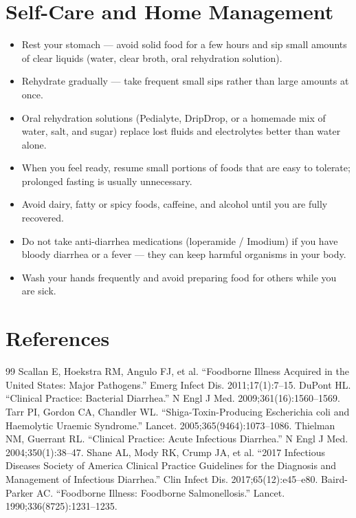 \section*{Self-Care and Home Management}
\begin{itemize}
  \item Rest your stomach — avoid solid food for a few hours and sip small amounts of clear liquids (water, clear broth, oral rehydration solution).
  \item Rehydrate gradually — take frequent small sips rather than large amounts at once.
  \item Oral rehydration solutions (Pedialyte, DripDrop, or a homemade mix of water, salt, and sugar) replace lost fluids and electrolytes better than water alone.
  \item When you feel ready, resume small portions of foods that are easy to tolerate; prolonged fasting is usually unnecessary.
  \item Avoid dairy, fatty or spicy foods, caffeine, and alcohol until you are fully recovered.
  \item Do not take anti-diarrhea medications (loperamide / Imodium) if you have bloody diarrhea or a fever — they can keep harmful organisms in your body.
  \item Wash your hands frequently and avoid preparing food for others while you are sick.
\end{itemize}

\section*{References}
\begin{thebibliography}{99}
 Scallan E, Hoekstra RM, Angulo FJ, et al. ``Foodborne Illness Acquired in the United States: Major Pathogens.'' Emerg Infect Dis. 2011;17(1):7--15.
 DuPont HL. ``Clinical Practice: Bacterial Diarrhea.'' N Engl J Med. 2009;361(16):1560--1569.
 Tarr PI, Gordon CA, Chandler WL. ``Shiga-Toxin-Producing Escherichia coli and Haemolytic Uraemic Syndrome.'' Lancet. 2005;365(9464):1073--1086.
 Thielman NM, Guerrant RL. ``Clinical Practice: Acute Infectious Diarrhea.'' N Engl J Med. 2004;350(1):38--47.
 Shane AL, Mody RK, Crump JA, et al. ``2017 Infectious Diseases Society of America Clinical Practice Guidelines for the Diagnosis and Management of Infectious Diarrhea.'' Clin Infect Dis. 2017;65(12):e45--e80.
 Baird-Parker AC. ``Foodborne Illness: Foodborne Salmonellosis.'' Lancet. 1990;336(8725):1231--1235.
\end{thebibliography}
